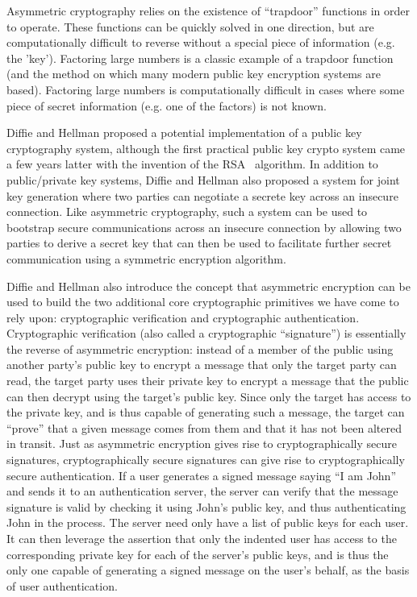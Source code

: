 Asymmetric cryptography relies on the existence of ``trapdoor''
functions in order to operate. These functions can be quickly solved
in one direction, but are computationally difficult to reverse without
a special piece of information (e.g. the 'key'). Factoring large
numbers is a classic example of a trapdoor function (and the method on
which many modern public key encryption systems are based). Factoring
large numbers is computationally difficult in cases where some piece
of secret information (e.g. one of the factors) is not known.

Diffie and Hellman proposed a potential implementation of a public key
cryptography system, although the first practical public key crypto
system came a few years latter with the invention of the
RSA~\cite{Rivest1978} algorithm. In addition to public/private key
systems, Diffie and Hellman also proposed a system for joint key
generation where two parties can negotiate a secrete key across an
insecure connection. Like asymmetric cryptography, such a system can
be used to bootstrap secure communications across an insecure
connection by allowing two parties to derive a secret key that can
then be used to facilitate further secret communication using a
symmetric encryption algorithm.

Diffie and Hellman also introduce the concept that asymmetric
encryption can be used to build the two additional core cryptographic
primitives we have come to rely upon: cryptographic verification and
cryptographic authentication. Cryptographic verification (also called
a cryptographic ``signature'') is essentially the reverse of
asymmetric encryption: instead of a member of the public using another
party's public key to encrypt a message that only the target party can
read, the target party uses their private key to encrypt a message
that the public can then decrypt using the target's public key. Since
only the target has access to the private key, and is thus capable of
generating such a message, the target can ``prove'' that a given
message comes from them and that it has not been altered in
transit. Just as asymmetric encryption gives rise to cryptographically
secure signatures, cryptographically secure signatures can give rise
to cryptographically secure authentication. If a user generates a
signed message saying ``I am John'' and sends it to an authentication
server, the server can verify that the message signature is valid by
checking it using John's public key, and thus authenticating John in
the process. The server need only have a list of public keys for each
user. It can then leverage the assertion that only the indented user
has access to the corresponding private key for each of the server's
public keys, and is thus the only one capable of generating a signed
message on the user's behalf, as the basis of user authentication.

